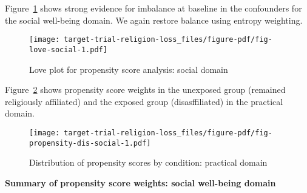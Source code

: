 \documentclass[
  singlecolumn]{report}
\begin{document}
Figure~\ref{fig-love-social} shows strong evidence for imbalance at
baseline in the confounders for the social well-being domain. We again
restore balance using entropy weighting.

\begin{figure}

{\centering \texttt{[image: target-trial-religion-loss\_files/figure-pdf/fig-love-social-1.pdf]}

}

\caption{\label{fig-love-social}Love plot for propensity score analysis:
social domain}

\end{figure}

Figure~\ref{fig-propensity-dis-social} shows propensity score weights in
the unexposed group (remained religiously affiliated) and the exposed
group (disasffiliated) in the practical domain.

\begin{figure}

{\centering \texttt{[image: target-trial-religion-loss\_files/figure-pdf/fig-propensity-dis-social-1.pdf]}

}

\caption{\label{fig-propensity-dis-social}Distribution of propensity
scores by condition: practical domain}

\end{figure}

\textbf{Summary of propensity score weights: social well-being domain}
\end{document}
